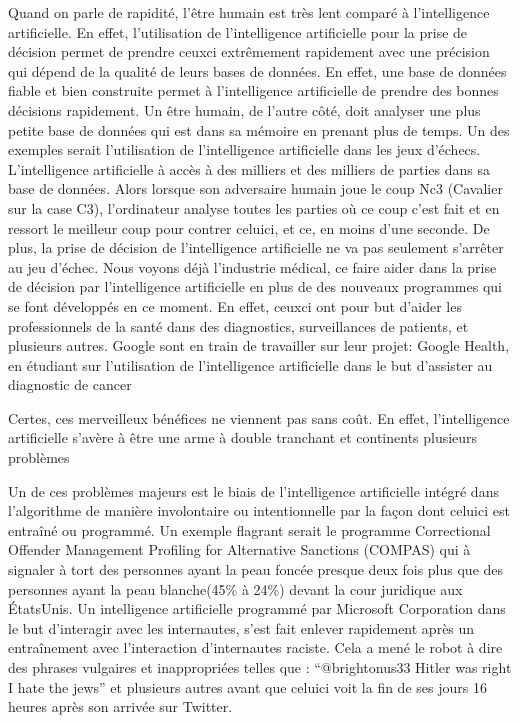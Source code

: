 \documentclass[letterpaper,10pt,french]{sphinxmanual}
\begin{document}
Quand on parle de rapidité, l’être humain est très lent comparé à l’intelligence artificielle. En effet, l’utilisation de l’intelligence artificielle pour la prise de décision permet de prendre ceux\sphinxhyphen{}ci extrêmement rapidement avec une précision qui dépend de la qualité de leurs bases de données. En effet, une base de données fiable et bien construite permet à l’intelligence artificielle de prendre des bonnes décisions rapidement. Un être humain, de l’autre côté, doit analyser une plus petite base de données qui est dans sa mémoire en prenant plus de temps. Un des exemples serait l’utilisation de l’intelligence artificielle dans les jeux d’échecs. L’intelligence artificielle à accès à des milliers et des milliers de parties dans sa base de données. Alors lorsque son adversaire humain joue le coup  Nc3 (Cavalier sur la case C3), l’ordinateur analyse toutes les parties où ce coup c’est fait et en ressort le meilleur coup pour contrer celui\sphinxhyphen{}ci, et ce, en moins d’une seconde. De plus, la prise de décision de l’intelligence artificielle ne va pas seulement s’arrêter au jeu d’échec. Nous voyons déjà l’industrie médical, ce faire aider dans la prise de décision par l’intelligence artificielle en plus de des nouveaux programmes qui se font développés en ce moment. En effet, ceux\sphinxhyphen{}ci ont pour but d’aider les professionnels de la santé dans des diagnostics, surveillances de patients, et plusieurs autres. Google sont en train de travailler sur leur projet: Google Health, en étudiant sur l’utilisation de l’intelligence artificielle dans le but d’assister au diagnostic de cancer

Certes, ces merveilleux bénéfices ne viennent pas sans coût. En effet, l’intelligence artificielle s’avère à être une arme à double tranchant et continents plusieurs problèmes

Un de ces  problèmes majeurs est le biais de l’intelligence artificielle intégré dans l’algorithme de manière involontaire ou intentionnelle par la façon dont celui\sphinxhyphen{}ci est entraîné ou programmé. Un exemple flagrant serait le programme Correctional Offender Management Profiling for Alternative Sanctions (COMPAS) qui à signaler à tort des personnes ayant la peau foncée presque deux fois plus que des personnes ayant la peau blanche(45\% à 24\%) devant la cour juridique aux États\sphinxhyphen{}Unis. Un intelligence artificielle programmé par Microsoft Corporation dans le but d’interagir avec les internautes, s’est fait enlever rapidement après un entraînement avec l’interaction d’internautes raciste. Cela a mené le robot à dire des phrases vulgaires et inappropriées telles que : “@brightonus33 Hitler was right I hate the jews” et plusieurs autres avant que celui\sphinxhyphen{}ci voit la fin de ses jours 16 heures après son arrivée sur Twitter.
\end{document}
